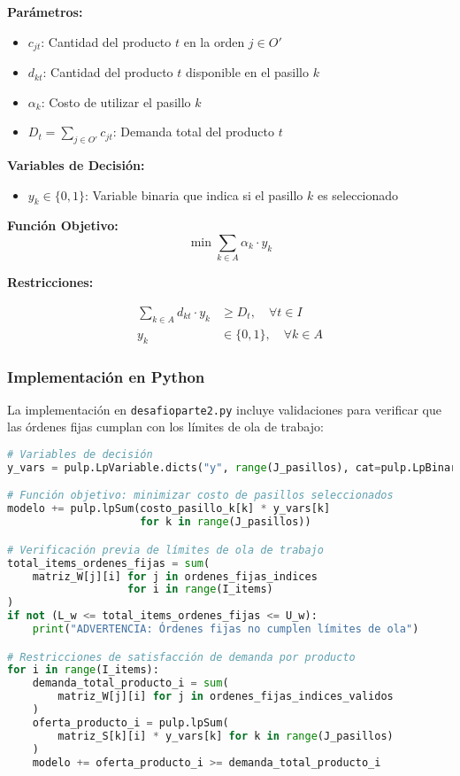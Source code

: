 \documentclass[a4paper,12pt]{article}
\begin{document}
\textbf{Parámetros:}
\begin{itemize}
    \item $c_{jt}$: Cantidad del producto $t$ en la orden $j \in O'$
    \item $d_{kt}$: Cantidad del producto $t$ disponible en el pasillo $k$
    \item $\alpha_k$: Costo de utilizar el pasillo $k$
    \item $D_t = \sum_{j \in O'} c_{jt}$: Demanda total del producto $t$
\end{itemize}

\textbf{Variables de Decisión:}
\begin{itemize}
    \item $y_k \in \{0,1\}$: Variable binaria que indica si el pasillo $k$ es seleccionado
\end{itemize}

\textbf{Función Objetivo:}
\begin{equation}
\min \sum_{k \in A} \alpha_k \cdot y_k
\end{equation}

\textbf{Restricciones:}

\begin{align}
\sum_{k \in A} d_{kt} \cdot y_k &\geq D_t, \quad \forall t \in I \label{eq:demand_satisfaction_v2} \\
y_k &\in \{0,1\}, \quad \forall k \in A \label{eq:binary_v2}
\end{align}

\subsubsection{Implementación en Python}

La implementación en \texttt{desafioparte2.py} incluye validaciones para verificar que las órdenes fijas cumplan con los límites de ola de trabajo:

\begin{lstlisting}[language=Python, caption=Implementación clave de la Variante 2]
# Variables de decisión
y_vars = pulp.LpVariable.dicts("y", range(J_pasillos), cat=pulp.LpBinary)

# Función objetivo: minimizar costo de pasillos seleccionados
modelo += pulp.lpSum(costo_pasillo_k[k] * y_vars[k] 
                     for k in range(J_pasillos))

# Verificación previa de límites de ola de trabajo
total_items_ordenes_fijas = sum(
    matriz_W[j][i] for j in ordenes_fijas_indices 
                   for i in range(I_items)
)
if not (L_w <= total_items_ordenes_fijas <= U_w):
    print("ADVERTENCIA: Órdenes fijas no cumplen límites de ola")

# Restricciones de satisfacción de demanda por producto
for i in range(I_items):
    demanda_total_producto_i = sum(
        matriz_W[j][i] for j in ordenes_fijas_indices_validos
    )
    oferta_producto_i = pulp.lpSum(
        matriz_S[k][i] * y_vars[k] for k in range(J_pasillos)
    )
    modelo += oferta_producto_i >= demanda_total_producto_i
\end{lstlisting}
\end{document}
